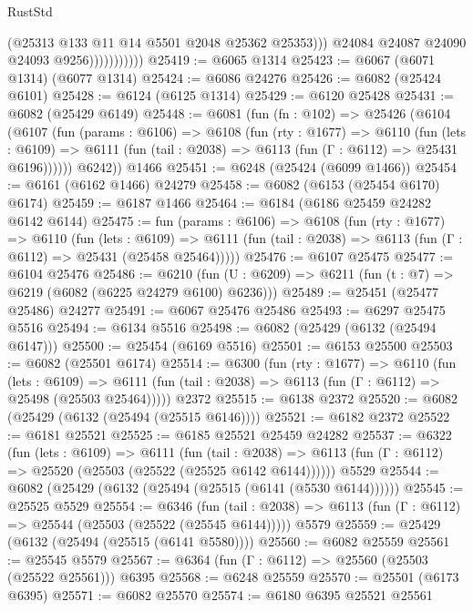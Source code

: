 \begin{lexlean}{RustStd}
\begin{coremodule}
                              (@25313 @133 @11 @14 @5501 @2048 @25362 @25353)))
                          @24084
                          @24087
                          @24090
                          @24093
                          @9256)))))))))))
@25419 := @6065 @1314
@25423 := @6067 (@6071 @1314) (@6077 @1314)
@25424 := @6086 @24276
@25426 := @6082 (@25424 @6101)
@25428 := @6124 (@6125 @1314)
@25429 := @6120 @25428
@25431 := @6082 (@25429 @6149)
@25448 := @6081
    (fun (fn : @102) =>
    @25426
      (@6104
        (@6107
          (fun (params : @6106) =>
          @6108
            (fun (rty : @1677) =>
            @6110
              (fun (lets : @6109) =>
              @6111 (fun (tail : @2038) => @6113 (fun (Γ : @6112) => @25431 @6196))))))
        @6242))
    @1466
@25451 := @6248 (@25424 (@6099 @1466))
@25454 := @6161 (@6162 @1466) @24279
@25458 := @6082 (@6153 (@25454 @6170) @6174)
@25459 := @6187 @1466
@25464 := @6184 (@6186 @25459 @24282 @6142 @6144)
@25475 := fun (params : @6106) =>
  @6108
    (fun (rty : @1677) =>
    @6110
      (fun (lets : @6109) =>
      @6111 (fun (tail : @2038) => @6113 (fun (Γ : @6112) => @25431 (@25458 @25464)))))
@25476 := @6107 @25475
@25477 := @6104 @25476
@25486 := @6210
    (fun (U : @6209) => @6211 (fun (t : @7) => @6219 (@6082 (@6225 @24279 @6100) @6236)))
@25489 := @25451 (@25477 @25486) @24277
@25491 := @6067 @25476 @25486
@25493 := @6297 @25475 @5516
@25494 := @6134 @5516
@25498 := @6082 (@25429 (@6132 (@25494 @6147)))
@25500 := @25454 (@6169 @5516)
@25501 := @6153 @25500
@25503 := @6082 (@25501 @6174)
@25514 := @6300
    (fun (rty : @1677) =>
    @6110
      (fun (lets : @6109) =>
      @6111 (fun (tail : @2038) => @6113 (fun (Γ : @6112) => @25498 (@25503 @25464)))))
    @2372
@25515 := @6138 @2372
@25520 := @6082 (@25429 (@6132 (@25494 (@25515 @6146))))
@25521 := @6182 @2372
@25522 := @6181 @25521
@25525 := @6185 @25521 @25459 @24282
@25537 := @6322
    (fun (lets : @6109) =>
    @6111
      (fun (tail : @2038) =>
      @6113 (fun (Γ : @6112) => @25520 (@25503 (@25522 (@25525 @6142 @6144))))))
    @5529
@25544 := @6082 (@25429 (@6132 (@25494 (@25515 (@6141 (@5530 @6144))))))
@25545 := @25525 @5529
@25554 := @6346
    (fun (tail : @2038) => @6113 (fun (Γ : @6112) => @25544 (@25503 (@25522 (@25545 @6144)))))
    @5579
@25559 := @25429 (@6132 (@25494 (@25515 (@6141 @5580))))
@25560 := @6082 @25559
@25561 := @25545 @5579
@25567 := @6364 (fun (Γ : @6112) => @25560 (@25503 (@25522 @25561))) @6395
@25568 := @6248 @25559
@25570 := @25501 (@6173 @6395)
@25571 := @6082 @25570
@25574 := @6180 @6395 @25521 @25561

\end{coremodule}
\end{lexlean}
